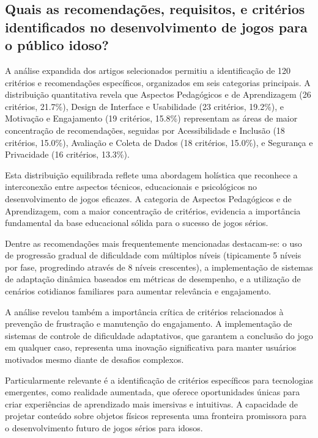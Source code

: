 \begin{table}[H]
\subsection{Quais as recomendações, requisitos, e critérios identificados no desenvolvimento de jogos para o público idoso?}
\label{subsec:qp1_expandida}

A análise expandida dos artigos selecionados permitiu a identificação de 120 critérios e recomendações específicos, organizados em seis categorias principais. A distribuição quantitativa revela que Aspectos Pedagógicos e de Aprendizagem (26 critérios, 21.7\%), Design de Interface e Usabilidade (23 critérios, 19.2\%), e Motivação e Engajamento (19 critérios, 15.8\%) representam as áreas de maior concentração de recomendações, seguidas por Acessibilidade e Inclusão (18 critérios, 15.0\%), Avaliação e Coleta de Dados (18 critérios, 15.0\%), e Segurança e Privacidade (16 critérios, 13.3\%).

Esta distribuição equilibrada reflete uma abordagem holística que reconhece a interconexão entre aspectos técnicos, educacionais e psicológicos no desenvolvimento de jogos eficazes. A categoria de Aspectos Pedagógicos e de Aprendizagem, com a maior concentração de critérios, evidencia a importância fundamental da base educacional sólida para o sucesso de jogos sérios.

Dentre as recomendações mais frequentemente mencionadas destacam-se: o uso de progressão gradual de dificuldade com múltiplos níveis (tipicamente 5 níveis por fase, progredindo através de 8 níveis crescentes), a implementação de sistemas de adaptação dinâmica baseados em métricas de desempenho, e a utilização de cenários cotidianos familiares para aumentar relevância e engajamento.

A análise revelou também a importância crítica de critérios relacionados à prevenção de frustração e manutenção do engajamento. A implementação de sistemas de controle de dificuldade adaptativos, que garantem a conclusão do jogo em qualquer caso, representa uma inovação significativa para manter usuários motivados mesmo diante de desafios complexos.

Particularmente relevante é a identificação de critérios específicos para tecnologias emergentes, como realidade aumentada, que oferece oportunidades únicas para criar experiências de aprendizado mais imersivas e intuitivas. A capacidade de projetar conteúdo sobre objetos físicos representa uma fronteira promissora para o desenvolvimento futuro de jogos sérios para idosos.


\end{table}
